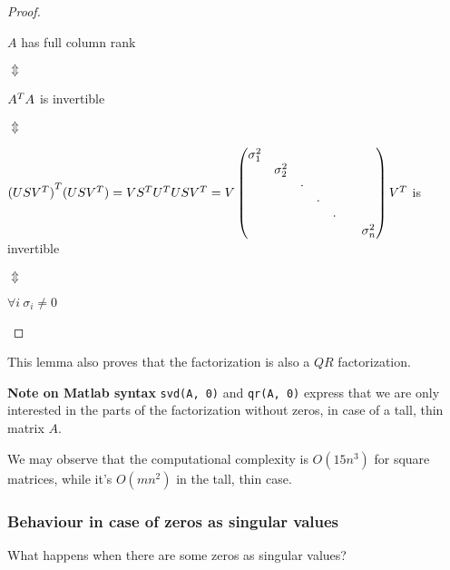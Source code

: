 \documentclass[computational_mathematics.tex]{subfiles}
\begin{document}
\begin{proof}
  \begin{center}
  $A$ has full column rank 
  
  $\Updownarrow$

  ${A}^{T}A$ is invertible
  
$\Updownarrow$
  
  ${(US{V}^{T})}^{T} (US{V}^{T}) = V{S}^{T}{U}^{T}US{V}^{T}
    = V \begin{pmatrix}
    \sigma_{1}^2 & & & & &\\
    & \sigma_{2}^2 & & & &\\
    & & \cdot & & &\\
    & & & \cdot & &\\
    & & & & \cdot &\\
    & & & & & & \sigma_{n}^2\\ 
  \end{pmatrix} {V}^{T}$
  is invertible 
  
$\Updownarrow$
  
  $\forall i ~ \sigma_i \neq 0$
\end{center}
\end{proof}

\begin{obs}
This lemma also proves that the factorization is also a $QR$ factorization.
\end{obs}
\begin{myframe}{\bf Note on Matlab syntax}
  \texttt{svd(A, 0)} and \texttt{qr(A, 0)} express that we are only interested in the parts of the factorization without zeros, in case of a tall, thin matrix $A$.
\end{myframe}
 We may observe that the computational complexity is $O(15n^3)$ for square matrices, while it's $O(mn^2)$ in the tall, thin case.

 \subsubsection{Behaviour in case of zeros as singular values}
 What happens when there are some zeros as singular values? 
 
\end{document}

